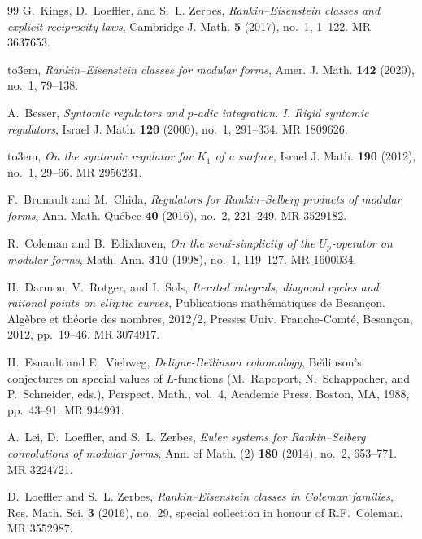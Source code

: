 \documentclass[10pt,a4paper]{amsart}
\providecommand{\bysame}{\leavevmode\hbox to3em{\hrulefill}\thinspace}
\providecommand{\MR}[1]{}
\renewcommand{\MR}[1]{%
 MR \href{http://www.ams.org/mathscinet-getitem?mr=#1}{#1}.
}
\providecommand{\href}[2]{#2}
\newcommand{\articlehref}[2]{\href{#1}{#2}}
\begin{document}
\begin{thebibliography}{99}
G.~Kings, D.~Loeffler, and S.~L. Zerbes,
  \articlehref{http://doi.org/10.4310/CJM.2017.v5.n1.a1}{\emph{{R}ankin--{E}isenstein
  classes and explicit reciprocity laws}}, Cambridge J. Math. \textbf{5}
  (2017), no.~1, 1--122. \MR{3637653}

\bysame,
  \articlehref{http://doi.org/10.1353/ajm.2020.0002}{\emph{{R}ankin--{E}isenstein
  classes for modular forms}}, Amer. J. Math. \textbf{142} (2020), no.~1,
  79--138.

A.~Besser, \articlehref{http://doi.org/10.1007/BF02834843}{\emph{Syntomic
  regulators and {$p$}-adic integration. {I}. {R}igid syntomic regulators}},
  Israel J. Math. \textbf{120} (2000), no.~1, 291--334. \MR{1809626}

\bysame, \articlehref{http://doi.org/10.1007/s11856-011-0188-0}{\emph{On the
  syntomic regulator for {$K_1$} of a surface}}, Israel J. Math. \textbf{190}
  (2012), no.~1, 29--66. \MR{2956231}

F.~Brunault and M.~Chida,
  \articlehref{http://doi.org/10.1007/s40316-015-0043-5}{\emph{Regulators
  for {R}ankin--{S}elberg products of modular forms}}, Ann. Math. Qu\'ebec
  \textbf{40} (2016), no.~2, 221--249. \MR{3529182}

R.~Coleman and B.~Edixhoven,
  \articlehref{http://doi.org/10.1007/s002080050140}{\emph{On the
  semi-simplicity of the {$U_p$}-operator on modular forms}}, Math. Ann.
  \textbf{310} (1998), no.~1, 119--127. \MR{1600034}

H.~Darmon, V.~Rotger, and I.~Sols, \emph{Iterated integrals, diagonal cycles
  and rational points on elliptic curves}, Publications math\'ematiques de
  {B}esan\c con. {A}lg\`ebre et th\'eorie des nombres, 2012/2, Presses Univ.
  Franche-Comt\'e, Besan\c con, 2012, pp.~19--46. \MR{3074917}

H.~Esnault and E.~Viehweg, \emph{Deligne-{B}e{\u\i}linson cohomology},
  Be{\u\i}linson's conjectures on special values of {$L$}-functions
  (M.~Rapoport, N.~Schappacher, and P.~Schneider, eds.), Perspect. Math.,
  vol.~4, Academic Press, Boston, MA, 1988, pp.~43--91. \MR{944991}

A.~Lei, D.~Loeffler, and S.~L. Zerbes,
  \articlehref{http://doi.org/10.4007/annals.2014.180.2.6}{\emph{Euler
  systems for {R}ankin--{S}elberg convolutions of modular forms}}, Ann. of
  Math. (2) \textbf{180} (2014), no.~2, 653--771. \MR{3224721}

D.~Loeffler and S.~L. Zerbes,
  \articlehref{http://doi.org/10.1186/s40687-016-0077-6}{\emph{Rankin--{E}isenstein
  classes in {C}oleman families}}, Res. Math. Sci. \textbf{3} (2016), no.~29,
  special collection in honour of R.F.~Coleman. \MR{3552987}
\end{thebibliography}
\end{document}
